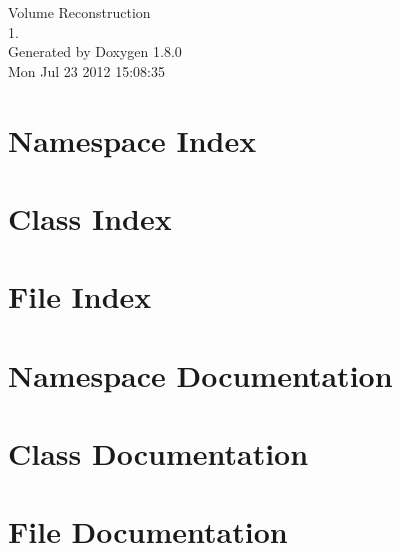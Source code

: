 \documentclass{book}
\begin{document}
\hypersetup{pageanchor=false,citecolor=blue}
\begin{titlepage}
\vspace*{7cm}
\begin{center}
{\Large Volume Reconstruction \\[1ex]\large 1. }\\
\vspace*{1cm}
{\large Generated by Doxygen 1.8.0}\\
\vspace*{0.5cm}
{\small Mon Jul 23 2012 15:08:35}\\
\end{center}
\end{titlepage}
\clearemptydoublepage
{}
\tableofcontents
\clearemptydoublepage
{}
\hypersetup{pageanchor=true,citecolor=blue}
\chapter{Namespace Index}

\chapter{Class Index}

\chapter{File Index}

\chapter{Namespace Documentation}

\chapter{Class Documentation}








\chapter{File Documentation}

















\printindex
\end{document}
